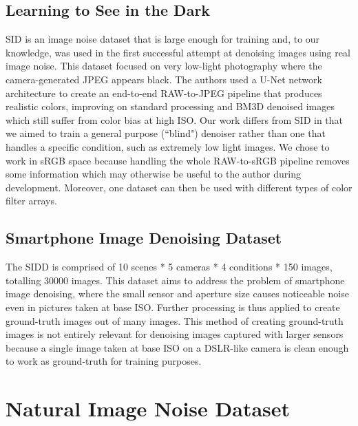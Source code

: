 \subsection{Learning to See in the Dark}
\acf{SID} is an image noise dataset that is large enough for training and, to our knowledge, was used in the first successful attempt at denoising images using real image noise. This dataset focused on very low-light photography where the camera-generated JPEG appears black. The authors used a U-Net network architecture to create an end-to-end RAW-to-JPEG pipeline that produces realistic colors, improving on standard processing and \acs{BM3D} denoised images which still suffer from color bias at high ISO. Our work differs from \ac{SID} in that we aimed to train a general purpose (``blind") denoiser rather than one that handles a specific condition, such as extremely low light images. We chose to work in sRGB space because handling the whole RAW-to-sRGB pipeline removes some information which may otherwise be useful to the author during development. Moreover, one dataset can then be used with different types of color filter arrays.
\subsection{Smartphone Image Denoising Dataset}
The \acf{SIDD} is comprised of 10 scenes * 5 cameras * 4 conditions * 150 images, totalling 30000 images. This dataset aims to address the problem of smartphone image denoising, where the small sensor and aperture size causes noticeable noise even in pictures taken at base ISO. Further processing is thus applied to create ground-truth images out of many images. This method of creating ground-truth images is not entirely relevant for denoising images captured with larger sensors because a single image taken at base ISO on a DSLR-like camera is clean enough to work as ground-truth for training purposes.
%
\section{Natural Image Noise Dataset}\label{sec:Natural Image Noise Dataset}

